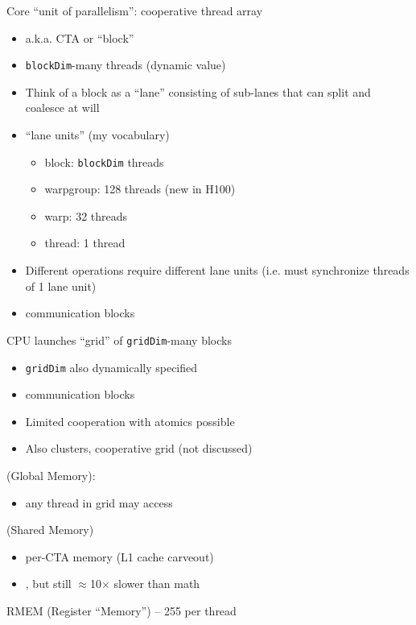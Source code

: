 \begin{minipage}[t]{0.5\textwidth}\fixminipage

Core ``unit of parallelism'': cooperative thread array
\begin{itemize}
  \item a.k.a. CTA or ``block''
  \item \texttt{blockDim}-many threads (dynamic value)
  \item Think of a block as a ``lane'' consisting of sub-lanes that can split and coalesce at will
  \item ``lane units'' (my vocabulary)
  \begin{itemize}
      \item block: \texttt{blockDim} threads
      \item warpgroup: 128 threads (new in H100)
      \item warp: 32 threads
      \item thread: 1 thread
  \end{itemize}
  \item Different operations require different lane units (i.e. must synchronize threads of 1 lane unit)
  \item {} communication  blocks
\end{itemize}

CPU launches ``grid'' of \texttt{gridDim}-many blocks
\begin{itemize}
  \item \texttt{gridDim} also dynamically specified
  \item {} communication  blocks
  \item Limited cooperation with atomics possible
  \item Also clusters, cooperative grid (not discussed)
\end{itemize}
\end{minipage}
\hfill
\begin{minipage}[t]{0.5\textwidth}\fixminipage
{} (Global Memory): 
\begin{itemize}
  \item any thread in grid may access
\end{itemize}
 (Shared Memory)
\begin{itemize}
  \item per-CTA memory (L1 cache carveout)
  \item {}, but still $\approx$10$\times$ slower than math
\end{itemize}
RMEM (Register ``Memory'') -- 255 per thread
\end{minipage}

